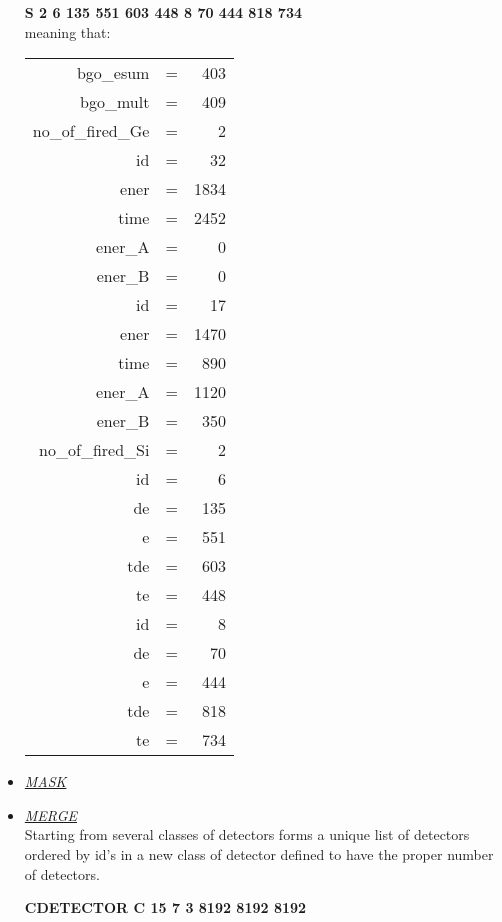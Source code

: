 \begin{itemize}
	\hskip1cm{\bf S  2   6  135  551  603  448    8   70  444  818  734} \\
	meaning that:
\begin{center}
\begin{tabular}{rcr}
			bgo\_esum         & = & 403  \\
			bgo\_mult         & = & 409  \\ 
		no\_of\_fired\_Ge         & = & 2    \\
				id        & = & 32   \\
				ener      & = & 1834 \\
				time      & = & 2452 \\
				ener\_A   & = & 0    \\ 
				ener\_B   & = & 0    \\
				id        & = & 17   \\ 
				ener      & = & 1470 \\
				time      & = & 890  \\
				ener\_A   & = & 1120 \\
				ener\_B   & = & 350  \\
			no\_of\_fired\_Si & = & 2    \\
				id        & = & 6    \\
				de        & = & 135  \\
				e         & = & 551  \\
				tde       & = & 603  \\
				te        & = & 448  \\
				id        & = & 8    \\
				de        & = & 70   \\
				e         & = & 444  \\
				tde       & = & 818  \\
				te        & = & 734  
\end{tabular}
\end{center}

 \item	{\it\underline{MASK}} \\
	 	
 \item	{\it\underline{MERGE}} \\

	Starting from several classes of detectors forms a unique list of
	detectors ordered by id's in a new class of detector defined to have 
	the proper number of detectors.

	\hskip1cm{\bf CDETECTOR C 15 7 3 8192 8192 8192} 


\end{itemize}
